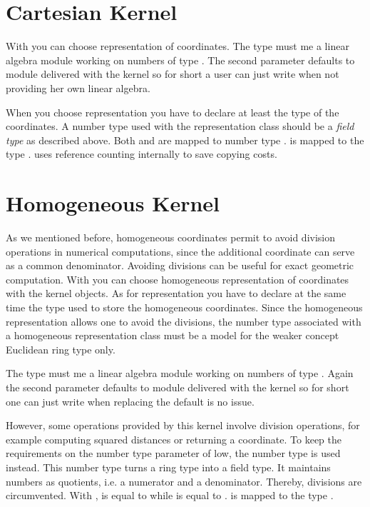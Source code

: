 \section{Cartesian Kernel}
With  you can choose
 representation of coordinates. The type
 must me a linear algebra module working on numbers
of type . The second parameter defaults to module
delivered with the kernel so for short a user can just write
 when not providing her own linear
algebra.

When you choose  representation you have
to declare at least the type of the coordinates.  A number type used
with the  representation class should be a {\em field
  type} as described above.  Both 
and  are mapped to number type
.
 is mapped to the
type .  uses
reference counting internally to save copying costs.

\section{Homogeneous Kernel}
As we mentioned before, homogeneous coordinates permit to avoid
division operations in numerical computations, since the additional
coordinate can serve as a common denominator.  Avoiding divisions can
be useful for exact geometric computation.  With
 you can choose
homogeneous representation of coordinates with the kernel objects. 
As for  representation you have to declare
at the same time the type used to store the homogeneous coordinates.
Since the homogeneous representation allows one to avoid the
divisions, the number type associated with a homogeneous
representation class must be a model for the weaker concept Euclidean
ring type only. 

The type  must me a linear algebra module working
on numbers of type . Again the second parameter
defaults to module delivered with the kernel so for short one can just
write  when replacing the default
is no issue.

However, some operations provided by this kernel involve division
operations, for example computing squared distances or returning a
 coordinate.  To keep the requirements on
the number type parameter of  low, the number type
 is used instead.  This number type
turns a ring type into a field type. It maintains numbers as
quotients, i.e. a numerator and a denominator.  Thereby, divisions are
circumvented.  With ,
 is equal to
 while
 is equal to
.
 is mapped to the
type .


